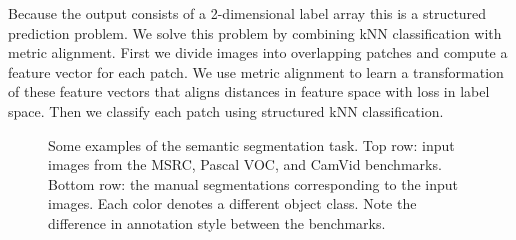 Because the output consists of a 2-dimensional label array this is a structured prediction problem. We solve this problem by combining \ac{kNN} classification with metric alignment. First we divide images into overlapping patches and compute a feature vector for each patch. We use metric alignment to learn a transformation of these feature vectors that aligns distances in feature space with loss in label space. Then we classify each patch using structured \ac{kNN} classification.

\begin{figure}[tbh]
\begin{center}
\caption{Some examples of the semantic segmentation task. Top row: input images from the MSRC, Pascal VOC, and CamVid benchmarks. Bottom row: the manual segmentations corresponding to the input images. Each color denotes a different object class. Note the difference in annotation style between the benchmarks.}
\label{fig:segmentation_examples}
\end{center}
\end{figure}


